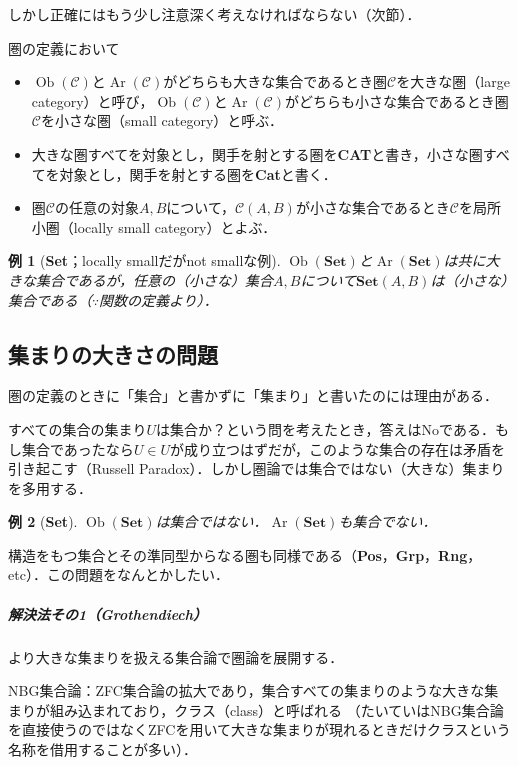 \documentclass[dvipdfmx,a4j,10pt]{jsarticle}
\theoremstyle{mystyle1}
\theoremstyle{mystyle2}
\newtheorem{example}{例}
\DeclareMathOperator{\Ob}{Ob}
\DeclareMathOperator{\Ar}{Ar}
\begin{document}
しかし正確にはもう少し注意深く考えなければならない（次節）．

圏の定義において
\begin{itemize}
	\item $\Ob(\mathcal{C})$と$\Ar(\mathcal{C})$がどちらも大きな集合であるとき圏$\mathcal{C}$を大きな圏（large category）と呼び，$\Ob(\mathcal{C})$と$\Ar(\mathcal{C})$がどちらも小さな集合であるとき圏$\mathcal{C}$を小さな圏（small category）と呼ぶ．
	\item 大きな圏すべてを対象とし，関手を射とする圏を\textbf{CAT}と書き，小さな圏すべてを対象とし，関手を射とする圏を\textbf{Cat}と書く．
	\item 圏$\mathcal{C}$の任意の対象$A,B$について，$\mathcal{C}(A,B)$が小さな集合であるとき$\mathcal{C}$を局所小圏（locally small category）とよぶ．
\end{itemize}

\begin{example}[\textbf{Set}；locally smallだがnot smallな例]
	$\Ob(\textbf{Set})$と$\Ar(\textbf{Set})$は共に大きな集合であるが，任意の（小さな）集合$A,B$について$\textbf{Set}(A,B)$は（小さな）集合である（$\because$関数の定義より）．
\end{example}

\setcounter{subsection}{7}

\subsection{集まりの大きさの問題}

圏の定義のときに「集合」と書かずに「集まり」と書いたのには理由がある．

すべての集合の集まり$U$は集合か？という問を考えたとき，答えはNoである．もし集合であったなら$U\in U$が成り立つはずだが，このような集合の存在は矛盾を引き起こす（Russell Paradox）．しかし圏論では集合ではない（大きな）集まりを多用する．
\begin{example}[\textbf{Set}]
	$\Ob(\textbf{Set})$は集合ではない．$\Ar(\textbf{Set})$も集合でない．
\end{example}
構造をもつ集合とその準同型からなる圏も同様である（\textbf{Pos}，\textbf{Grp}，\textbf{Rng}，etc）．この問題をなんとかしたい．

\vspace{0.5\baselineskip}

\subparagraph{解決法その1（Grothendiech）}

より大きな集まりを扱える集合論で圏論を展開する．

NBG集合論：ZFC集合論の拡大であり，集合すべての集まりのような大きな集まりが組み込まれており，クラス（class）と呼ばれる
（たいていはNBG集合論を直接使うのではなくZFCを用いて大きな集まりが現れるときだけクラスという名称を借用することが多い）．
\end{document}
